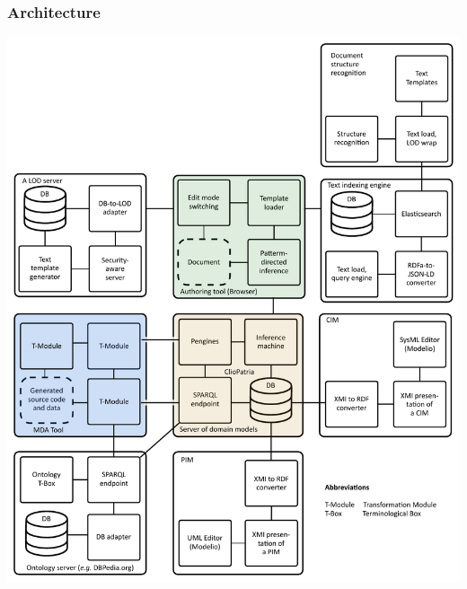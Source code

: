 \documentclass[10pt]{beamer}
\begin{document}
\begin{frame}
  \frametitle{Architecture}
  \begin{adjustwidth}{-2.5em}{-2.5em}
    \begin{center}
      \includegraphics[width=0.5\linewidth]{architecture-mda-lod-ext-tot.pdf}
    \end{center}
  \end{adjustwidth}

\end{frame}
\end{document}
